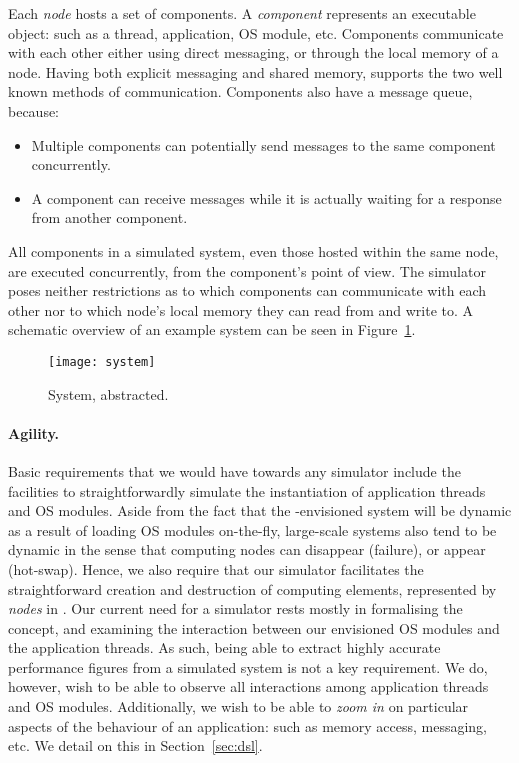 Each \emph{node} hosts a set of components.
A \emph{component} represents an executable object: such as a thread, application, OS module, etc.
Components communicate with each other either using direct messaging, or through the local memory of a node.
Having both explicit messaging and shared memory, \soosim supports the two well known methods of communication.
Components also have a message queue, because:
\begin{itemize}
  \item Multiple components can potentially send messages to the same component concurrently.
  \item A component can receive messages while it is actually waiting for a response from another component.
\end{itemize}
All components in a simulated system, even those hosted within the same node, are executed concurrently, from the component's point of view.
The simulator poses neither restrictions as to which components can communicate with each other nor to which node's local memory they can read from and write to.
A schematic overview of an example system can be seen in Figure~\ref{fig:system}.

\begin{figure}
\centering
%
\texttt{[image: system]}
\caption{System, abstracted.}
\vspace{-1em}
\label{fig:system}
\end{figure}

\paragraph{Agility.}
Basic requirements that we would have towards any simulator include the facilities to straightforwardly simulate the instantiation of application threads and OS modules.
Aside from the fact that the \soos-envisioned system will be dynamic as a result of loading OS modules on-the-fly, large-scale systems also tend to be dynamic in the sense that computing nodes can disappear (failure), or
appear (hot-swap).
Hence, we also require that our simulator facilitates the straightforward creation and destruction of computing elements, represented by \emph{nodes} in \soosim.
Our current need for a simulator rests mostly in formalising the \soos concept, and examining the interaction between our envisioned OS modules and the application threads.
As such, being able to extract highly accurate performance figures from a simulated system is not a key requirement.
We do, however, wish to be able to observe all interactions among application threads and OS modules.
Additionally, we wish to be able to \emph{zoom in} on particular aspects of the behaviour of an application: such as memory access, messaging, etc.
We detail on this in Section~\ref{sec:dsl}.

